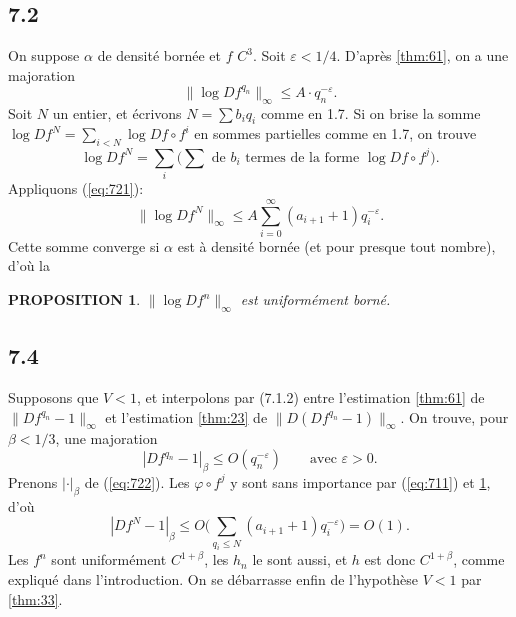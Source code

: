\documentclass[12pt]{amsart}
\theoremstyle{plain}
\newtheorem{proposition}[theoreme]{PROPOSITION}
\theoremstyle{remark}
\begin{document}
\subsection*{7.2}
On suppose $\alpha$ de densit\'{e} born\'{e}e et $f$ $C^{3}$. Soit $\varepsilon < 1/4$. D'apr\`{e}s \ref{thm:61}, on a une majoration
\begin{equation}\label{eq:721}
\|\log Df^{q_{n}}\|_{\infty} \leq A \cdot q_{n}^{-\varepsilon} .
\end{equation}
Soit $N$ un entier, et \'{e}crivons $N = \sum b_{i}q_{i}$ comme en 1.7. Si on brise la somme $\log Df^{N} = \sum_{i < N} \log Df \circ f^{i}$ en sommes partielles comme en 1.7, on trouve
\begin{equation}\label{eq:722}
\log Df^{N} = \sum_{i} \bigl(\sum \text{ de } b_{i} \text{ termes de la forme } \log Df \circ f^{j}\bigr) .
\end{equation}
Appliquons (\ref{eq:721}):
\begin{equation}\label{eq:723}
\|\log Df^{N}\|_{\infty} \leq A \sum_{i=0}^{\infty} (a_{i+1} + 1)q_{i}^{-\varepsilon} .
\end{equation}
Cette somme converge si $\alpha$ est \`{a} densit\'{e} born\'{e}e (et pour presque tout nombre), d'o\`{u} la

\begin{proposition}\label{prop:73}
$\|\log Df^{n}\|_{\infty}$ est uniform\'{e}ment born\'{e}.
\end{proposition}

\subsection*{7.4}
Supposons que $V < 1$, et interpolons par (7.1.2) entre l'estimation \ref{thm:61} de $\|Df^{q_{n}} - 1\|_{\infty}$ et l'estimation \ref{thm:23} de $\|D(Df^{q_{n}} - 1)\|_{\infty}$. On trouve, pour $\beta < 1/3$, une majoration
\begin{equation}\label{eq:741}
|Df^{q_{n}} - 1|_{\beta} \leq O(q_{n}^{-\varepsilon}) \qquad \text{avec } \varepsilon > 0 .
\end{equation}
Prenons $|\cdot|_{\beta}$ de (\ref{eq:722}). Les $\varphi \circ f^{j}$ y sont sans importance par (\ref{eq:711}) et \ref{prop:73}, d'o\`{u}
\[
|Df^{N} - 1|_{\beta} \leq O\bigl(\sum_{q_{i} \leq N} (a_{i+1} + 1)q_{i}^{-\varepsilon}\bigr) = O(1) .
\]
Les $f^{n}$ sont uniform\'{e}ment $C^{1+\beta}$, les $h_{n}$ le sont aussi, et $h$ est donc $C^{1+\beta}$, comme expliqu\'{e} dans l'introduction. On se d\'{e}barrasse enfin de l'hypoth\`{e}se $V < 1$ par \ref{thm:33}.
\end{document}
